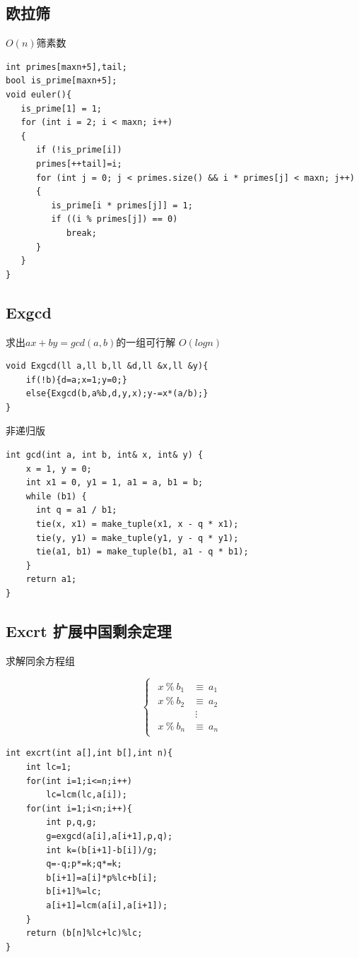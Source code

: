 \documentclass[a4]{ctexart}
\begin{document}
\subsection{欧拉筛}
$O(n)$筛素数
\begin{lstlisting}
int primes[maxn+5],tail;
bool is_prime[maxn+5];
void euler(){
   is_prime[1] = 1;
   for (int i = 2; i < maxn; i++)
   {
      if (!is_prime[i])
      primes[++tail]=i;
      for (int j = 0; j < primes.size() && i * primes[j] < maxn; j++)
      {
         is_prime[i * primes[j]] = 1;
         if ((i % primes[j]) == 0)
            break;
      }
   }
}
\end{lstlisting}

\subsection{Exgcd}
求出$ax+by=gcd(a,b)$的一组可行解 $O(logn)$ 
\begin{lstlisting}
void Exgcd(ll a,ll b,ll &d,ll &x,ll &y){
	if(!b){d=a;x=1;y=0;}
	else{Exgcd(b,a%b,d,y,x);y-=x*(a/b);}
}
\end{lstlisting}
非递归版
\begin{lstlisting}
int gcd(int a, int b, int& x, int& y) {
    x = 1, y = 0;
    int x1 = 0, y1 = 1, a1 = a, b1 = b;
    while (b1) {
      int q = a1 / b1;
      tie(x, x1) = make_tuple(x1, x - q * x1);
      tie(y, y1) = make_tuple(y1, y - q * y1);
      tie(a1, b1) = make_tuple(b1, a1 - q * b1);
    }
    return a1;
}
\end{lstlisting}
\subsection{Excrt 扩展中国剩余定理}
\begin{center}
	求解同余方程组
\end{center}

\[
\begin{cases}
	\begin{aligned}
	x \ \% \ b_1  &\equiv \  a_1\\
	x \ \% \ b_2  &\equiv \ a_2\\
	           		& \ \vdots   \\
	x \ \% \ b_n  &\equiv  \ a_n
	\end{aligned}
\end{cases}
\]

  
  
\begin{lstlisting}
int excrt(int a[],int b[],int n){
    int lc=1;
    for(int i=1;i<=n;i++)
        lc=lcm(lc,a[i]);
    for(int i=1;i<n;i++){
        int p,q,g;
        g=exgcd(a[i],a[i+1],p,q);
        int k=(b[i+1]-b[i])/g;
        q=-q;p*=k;q*=k;
        b[i+1]=a[i]*p%lc+b[i];
        b[i+1]%=lc;
        a[i+1]=lcm(a[i],a[i+1]);
    }
    return (b[n]%lc+lc)%lc;
}
\end{lstlisting}
\end{document}
